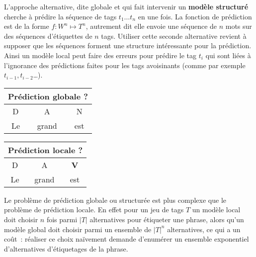 \documentclass[11pt,openany]{book}
\begin{document}
L'approche alternative, dite globale et qui fait intervenir un {\bf modèle structuré} cherche à prédire la séquence de tags $t_1\ldots t_n$ en une fois.  La fonction de prédiction est de la forme $f:W^n \mapsto T^n$, autrement dit elle envoie une séquence de $n$ mots sur des séquences d'étiquettes de $n$ tags.  Utiliser cette seconde alternative  revient à supposer que les séquences forment une structure intéressante pour la prédiction. Ainsi un modèle local
peut faire des erreurs pour prédire le tag $t_i$ qui sont liées à l'ignorance des prédictions 
faites pour les tags avoisinants (comme par exemple $t_{i-1},t_{i-2}$\ldots). 

\begin{center}
\begin{tabular}{ccc}\toprule
\multicolumn{3}{c}{Prédiction globale ?}\\\midrule
D & A & N\\
Le & grand & est\\\bottomrule
\end{tabular}
\begin{tabular}{ccc}\toprule
\multicolumn{3}{c}{Prédiction locale ?}\\\midrule
D & A & {\bf\color{red} V}\\
Le & grand & est\\\bottomrule
\end{tabular}
\end{center}

Le problème de prédiction globale ou structurée est plus complexe que le problème de prédiction locale. En effet pour un jeu de tags $T$ un modèle local doit choisir $n$ fois parmi $|T|$ alternatives pour étiqueter une phrase,  alors qu'un modèle global doit choisir parmi un ensemble de $|T|^n$ alternatives, ce qui a un coût~: réaliser ce choix naïvement demande d'enumérer un ensemble  exponentiel d'alternatives d'étiquetages de la phrase.
\end{document}
